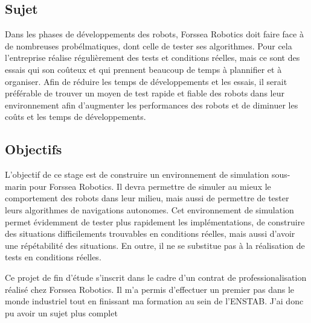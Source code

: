 \subsection{Sujet}
    Dans les phases de développements des robots, Forssea Robotics doit faire face à de nombreuses probélmatiques, dont celle de tester ses algorithmes. Pour cela l'entreprise réalise régulièrement des tests et conditions réelles, mais ce sont des essais qui son coûteux et qui prennent beaucoup de temps à plannifier et à organiser. Afin de réduire les temps de développements et les essais, il serait préférable de trouver un moyen de test rapide et fiable des robots dans leur environnement afin d'augmenter les performances des robots et de diminuer les coûts et les temps de développements.

\subsection{Objectifs}
    L'objectif de ce stage est de construire un environnement de simulation sous-marin pour Forssea Robotics. Il devra permettre de simuler au mieux le comportement des robots dans leur milieu, mais aussi de permettre de tester leurs algorithmes de navigations autonomes. Cet environnement de simulation permet évidemment de tester plus rapidement les implémentations, de construire des situations difficilements trouvables en conditions réelles, mais aussi d'avoir une répétabilité des situations. En outre, il ne se substitue pas à la réalisation de tests en conditions réelles.

    Ce projet de fin d'étude s'inscrit dans le cadre d'un contrat de professionalisation réalisé chez Forssea Robotics. Il m'a permis d'effectuer un premier pas dans le monde industriel tout en finissant ma formation au sein de l'\gls{ENSTAB}. J'ai donc pu avoir un sujet plus complet